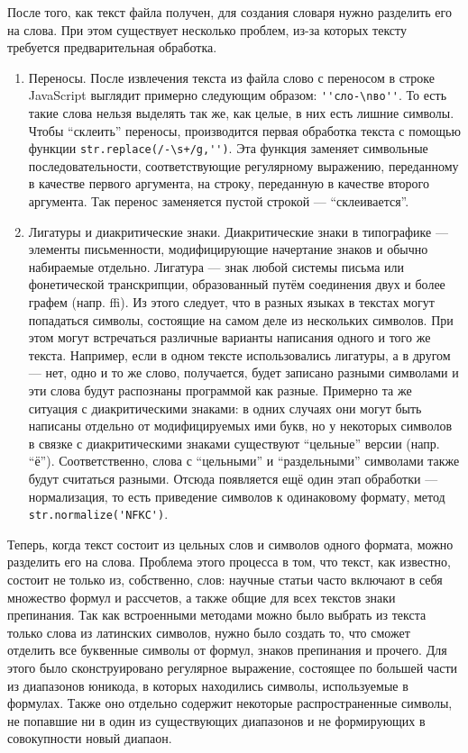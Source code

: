 \documentclass[a4paper,openbib]{report}
\begin{document}
После того, как текст файла получен, для создания словаря нужно разделить его на слова. При этом существует несколько проблем, из-за которых тексту требуется 
предварительная обработка.
\begin{enumerate}
\item
 Переносы.
 После извлечения текста из файла слово с переносом в строке JavaScript выглядит примерно следующим образом: \verb|''сло-\nво''|. То есть такие слова нельзя выделять 
 так же, как целые, в них есть лишние символы. Чтобы ``склеить'' переносы, производится первая обработка текста с помощью функции \verb|str.replace(/-\s+/g,'')|. 
 Эта функция заменяет символьные последовательности, соответствующие регулярному выражению, переданному в качестве первого аргумента, на строку, переданную в 
 качестве второго аргумента. Так перенос заменяется пустой строкой --- ``склеивается''.
\item
 Лигатуры и диакритические знаки.
 Диакритические знаки в типографике --- элементы письменности, модифицирующие начертание знаков и обычно набираемые отдельно.
 Лигатура --- знак любой системы письма или фонетической транскрипции, образованный путём соединения двух и более графем (напр. ffi).
 Из этого следует, что в разных языках в текстах могут попадаться символы, состоящие на самом деле из нескольких символов. При этом могут встречаться различные 
 варианты написания одного и того же текста. Например, если в одном тексте использовались лигатуры, а в другом --- нет, одно и то же слово, получается, будет записано 
 разными символами и эти слова будут распознаны программой как разные. Примерно та же ситуация с диакритическими знаками: в одних случаях они могут быть написаны 
 отдельно от модифицируемых ими букв, но у некоторых символов в связке с диакритическими знаками существуют ``цельные'' версии (напр. ``ё''). Соответственно, 
 слова с ``цельными'' и ``раздельными'' символами также будут считаться разными.
 Отсюда появляется ещё один этап обработки --- нормализация, то есть приведение символов к одинаковому формату, метод \verb|str.normalize('NFKC')|.
\end{enumerate}
Теперь, когда текст состоит из цельных слов и символов одного формата, можно разделить его на слова. Проблема этого процесса в том, что текст, как известно, состоит 
не только из, собственно, слов: научные статьи часто включают в себя множество формул и рассчетов, а также общие для всех текстов знаки препинания. Так как встроенными 
методами можно было выбрать из текста только слова из латинских символов, нужно было создать то, что сможет отделить все буквенные символы от формул, знаков препинания 
и прочего. Для этого было сконструировано регулярное выражение, состоящее по большей части из диапазонов юникода, в которых находились символы, используемые в формулах. 
Также оно отдельно содержит некоторые распространенные символы, не попавшие ни в один из существующих диапазонов и не формирующих в совокупности новый диапаон.
\end{document}
